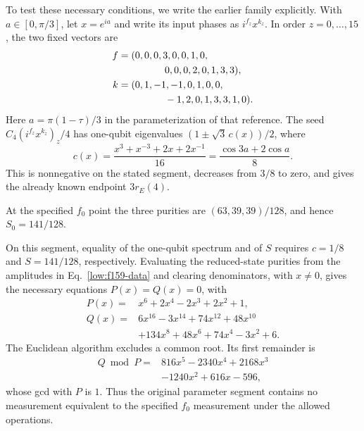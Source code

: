 To test these necessary conditions, we write the earlier family explicitly. With $a\in[0,\pi/3]$, let $x=e^{ia}$ and write its input phases as
$i^{f_z}x^{k_z}$.  In order $z=0,\ldots,15$, the two fixed vectors are
\begin{align}
 f={}&(0,0,0,3,0,0,1,0,\nonumber\\
 &\hspace{12mm}0,0,0,2,0,1,3,3),\nonumber\\
 k={}&(0,1,-1,-1,0,1,0,0,\nonumber\\
 &\hspace{12mm}-1,2,0,1,3,3,1,0).
 \label{low:f159-data}
\end{align}
Here $a=\pi(1-\tau)/3$ in the parameterization of that reference.
The seed $C_4(i^{f_z}x^{k_z})_z/4$ has one-qubit eigenvalues
$(1\pm\sqrt3\,c(x))/2$, where
\begin{equation}
 c(x)=\frac{x^3+x^{-3}+2x+2x^{-1}}{16}
 =\frac{\cos3a+2\cos a}{8}.
 \label{low:f159-component}
\end{equation}
This is nonnegative on the stated segment, decreases from $3/8$ to
zero, and gives the already known endpoint $3r_E(4)$.

At the specified $f_0$ point the three purities are
$(63,39,39)/128$, and hence $S_0=141/128$.

On this segment, equality of the one-qubit spectrum and of $S$ requires $c=1/8$ and $S=141/128$, respectively. Evaluating the reduced-state purities
from the amplitudes in Eq.~\eqref{low:f159-data} and clearing
denominators, with $x\ne0$, gives the necessary equations
$P(x)=Q(x)=0$, with
\begin{align}
 P(x)={}&x^6+2x^4-2x^3+2x^2+1,\nonumber\\
 Q(x)={}&6x^{16}-3x^{14}+74x^{12}+48x^{10}\nonumber\\
 &+134x^8+48x^6+74x^4-3x^2+6.
 \label{low:invariant-polynomials}
\end{align}
The Euclidean algorithm excludes a common root. Its first remainder is
\begin{equation}
 \begin{aligned}
 Q\bmod P={}&816x^5-2340x^4+2168x^3\\
 &-1240x^2+616x-596,
 \end{aligned}
\end{equation}
whose gcd with $P$ is $1$.  Thus the original parameter segment
contains no measurement equivalent to the specified $f_0$ measurement
under the allowed operations.
